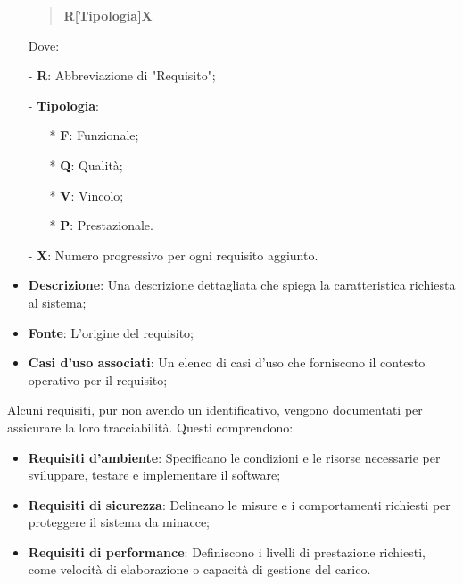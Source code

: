 \documentclass[10pt]{article}
\begin{document}
\begin{justify}
\begin{itemize}
\begin{quote}
                \textbf{R[{Tipologia}]X}
            \end{quote}
            Dove:
            \item [-] \textbf{R}: Abbreviazione di "Requisito";
            \item [-] \textbf{Tipologia}:
            \begin{itemize}
                \item [*] \textbf{F}: Funzionale;
                \item [*] \textbf{Q}: Qualità;
                \item [*] \textbf{V}: Vincolo;
                \item [*] \textbf{P}: Prestazionale.
            \end{itemize}
            \item [-] \textbf{X}: Numero progressivo per ogni requisito aggiunto.
            \item \textbf{Descrizione}: Una descrizione dettagliata che spiega la caratteristica richiesta al sistema;
            \item \textbf{Fonte}: L'origine del requisito;
            \item \textbf{Casi d'uso associati}: Un elenco di casi d'uso che forniscono il contesto operativo per il requisito;
        \end{itemize}
        Alcuni requisiti, pur non avendo un identificativo, vengono documentati per assicurare la loro tracciabilità. Questi comprendono:
        \begin{itemize}
            \item \textbf{Requisiti d'ambiente}: Specificano le condizioni e le risorse necessarie per sviluppare, testare e implementare il software;
            \item \textbf{Requisiti di sicurezza}: Delineano le misure e i comportamenti richiesti per proteggere il sistema da minacce;
            \item \textbf{Requisiti di performance}: Definiscono i livelli di prestazione richiesti, come velocità di elaborazione o capacità di gestione del carico.
        \end{itemize}


\end{justify}
\end{document}
